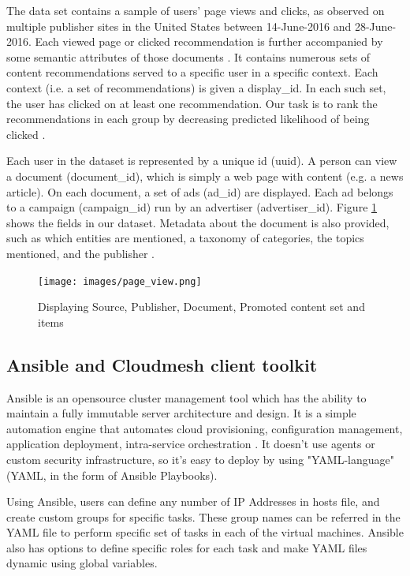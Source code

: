\documentclass[9pt,twocolumn,twoside]{../../styles/osajnl}
\begin{document}
The data set contains a sample of users’ page views and clicks, as observed on multiple publisher sites in the United States between 14-June-2016 and 28-June-2016. Each viewed page or clicked recommendation is further accompanied by some semantic attributes of those documents \cite{kaggle-outbrain}. It contains numerous sets of content recommendations served to a specific user in a specific context. Each context (i.e. a set of recommendations) is given a display\_id. In each such set, the user has clicked on at least one recommendation. Our task is to rank the recommendations in each group by decreasing predicted likelihood of being clicked \cite{kaggle-outbrain}.

Each user in the dataset is represented by a unique id (uuid). A person can view a document (document\_id), which is simply a web page with content (e.g.  a news article). On each document, a set of ads (ad\_id) are displayed. Each ad belongs to a campaign (campaign\_id) run by an advertiser (advertiser\_id). Figure \ref{fig:OutbrainData} shows the fields in our dataset. Metadata about the document is also provided, such as which entities are mentioned, a taxonomy of categories, the topics mentioned, and the publisher \cite{kaggle-outbrain}.

\begin{figure}[hptb]
\centering
\texttt{[image: images/page\_view.png]}
\caption{Displaying Source, Publisher, Document, Promoted content set and items \cite{kaggle-outbrain}}
\label{fig:OutbrainData}
\end{figure}

\subsection{Ansible and Cloudmesh client toolkit}
Ansible is an opensource cluster management tool which has the ability to maintain a fully immutable server architecture and design. It is a simple automation engine that automates cloud provisioning, configuration management, application deployment, intra-service orchestration \cite{www-ansible-work}. It doesn't use agents or custom security infrastructure, so it's easy to deploy by using "YAML-language" (YAML, in the form of Ansible Playbooks). 

Using Ansible, users can define any number of IP Addresses in hosts file, and create custom groups for specific tasks. These group names can be referred in the YAML file to perform specific set of tasks in each of the virtual machines. Ansible also has options to define specific roles for each task and make YAML files dynamic using global variables.
\end{document}

